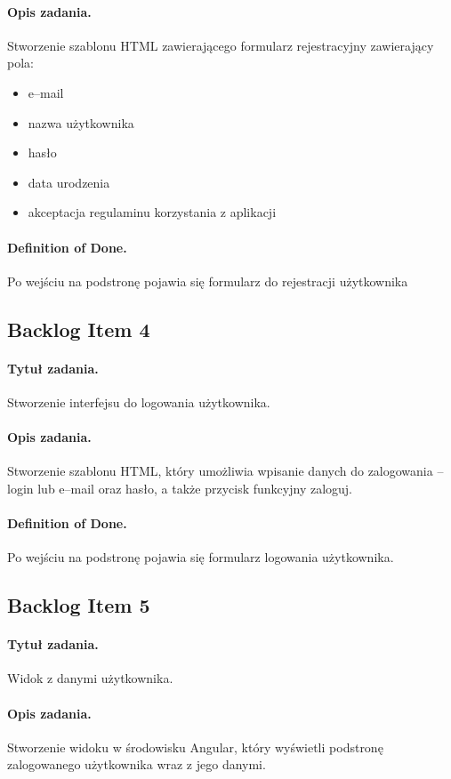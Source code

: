 \documentclass[a4paper]{article}
\begin{document}
\paragraph{Opis zadania.} Stworzenie szablonu HTML zawierającego formularz rejestracyjny zawierający pola: 
\begin{itemize}
\item e--mail
\item nazwa użytkownika
\item hasło
\item data urodzenia
\item akceptacja regulaminu korzystania z aplikacji
\end{itemize}
\paragraph{Definition of Done.} Po wejściu na podstronę pojawia się formularz do rejestracji użytkownika

 
\subsection{Backlog Item 4} 
\paragraph{Tytuł zadania.} Stworzenie interfejsu do logowania użytkownika.
\paragraph{Opis zadania.} Stworzenie szablonu HTML, który umożliwia wpisanie danych do zalogowania -- login lub e--mail oraz hasło, a także przycisk funkcyjny zaloguj.
\paragraph{Definition of Done.} Po wejściu na podstronę pojawia się formularz logowania użytkownika.

\subsection{Backlog Item 5} 
\paragraph{Tytuł zadania.} Widok z danymi użytkownika.
\paragraph{Opis zadania.} Stworzenie widoku w środowisku Angular, który wyświetli podstronę zalogowanego użytkownika wraz z jego danymi.
\end{document}
